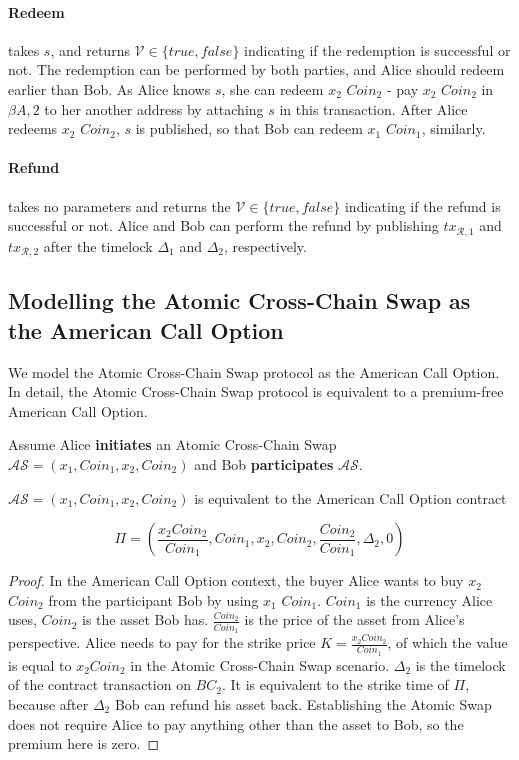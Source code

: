 \paragraph{Redeem}
takes $s$,
and returns $\mathcal{V} \in \{true, false\}$ indicating if the redemption is successful or not.
The redemption can be performed by both parties, and Alice should redeem earlier than Bob.
As Alice knows $s$, she can redeem $x_2$ $Coin_2$ - pay $x_2$ $Coin_2$ in $\beta{A, 2}$ to her another address by attaching $s$ in this transaction.
After Alice redeems $x_2$ $Coin_2$, $s$ is published, so that Bob can redeem $x_1$ $Coin_1$, similarly.

\paragraph{Refund}
takes no parameters and returns the $\mathcal{V} \in \{true, false\}$ indicating if the refund is successful or not.
Alice and Bob can perform the refund by publishing $tx_{\mathcal{R}, 1}$ and $tx_{\mathcal{R}, 2}$ after the timelock $\Delta_1$ and $\Delta
_2$, respectively.

\subsection{Modelling the Atomic Cross-Chain Swap as the American Call Option}

We model the Atomic Cross-Chain Swap protocol as the American Call Option.
In detail, the Atomic Cross-Chain Swap protocol is equivalent to a premium-free American Call Option.

Assume Alice \textbf{initiates} an Atomic Cross-Chain Swap $\mathcal{AS} = (x_1, Coin_1, x_2, Coin_2)$ and Bob \textbf{participates} $\mathcal{AS}$.

\begin{theorem}
$\mathcal{AS} = (x_1, Coin_1, x_2, Coin_2)$ is equivalent to the American Call Option contract

$$
\Pi = (\frac{x_2 Coin_2}{Coin_1}, Coin_1, x_2, Coin_2, \frac{Coin_2}{Coin_1}, \Delta_2, 0)
$$
\end{theorem}

\begin{proof}
In the American Call Option context, the buyer Alice wants to buy $x_2$ $Coin_2$ from the participant Bob by using $x_1$ $Coin_1$.
$Coin_1$ is the currency Alice uses, $Coin_2$ is the asset Bob has.
$\frac{Coin_2}{Coin_1}$ is the price of the asset from Alice's perspective.
Alice needs to pay for the strike price $K = \frac{x_2 Coin_2}{Coin_1}$, of which the value is equal to $x_2 Coin_2$ in the Atomic Cross-Chain Swap scenario.
$\Delta_2$ is the timelock of the contract transaction on $BC_2$.
It is equivalent to the strike time of $\Pi$, because after $\Delta_2$ Bob can refund his asset back.
Establishing the Atomic Swap does not require Alice to pay anything other than the asset to Bob, so the premium here is zero.
\end{proof}

